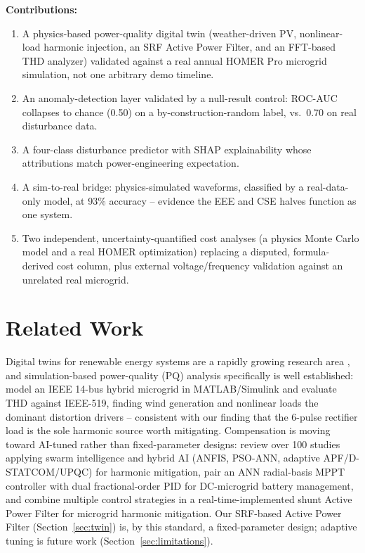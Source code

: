 \documentclass[conference,a4paper]{IEEEtran}
\begin{document}
\textbf{Contributions:}
\begin{enumerate}
\item A physics-based power-quality digital twin (weather-driven PV,
  nonlinear-load harmonic injection, an SRF Active Power Filter, and
  an FFT-based THD analyzer) validated against a real annual HOMER
  Pro microgrid simulation, not one arbitrary demo timeline.
\item An anomaly-detection layer validated by a null-result control:
  ROC-AUC collapses to chance (0.50) on a by-construction-random
  label, vs.\ 0.70 on real disturbance data.
\item A four-class disturbance predictor with SHAP explainability
  whose attributions match power-engineering expectation.
\item A sim-to-real bridge: physics-simulated waveforms, classified
  by a real-data-only model, at 93\% accuracy -- evidence the EEE
  and CSE halves function as one system.
\item Two independent, uncertainty-quantified cost analyses (a
  physics Monte Carlo model and a real HOMER optimization) replacing
  a disputed, formula-derived cost column, plus external
  voltage/frequency validation against an unrelated real microgrid.
\end{enumerate}

\section{Related Work}

Digital twins for renewable energy systems are a rapidly growing
research area \cite{mbasso2025dtreview}, and simulation-based
power-quality (PQ) analysis specifically is well established:
\cite{hernandezmayoral2024pq} model an IEEE 14-bus hybrid microgrid in
MATLAB/Simulink and evaluate THD against IEEE-519, finding wind
generation and nonlinear loads the dominant distortion drivers --
consistent with our finding that the 6-pulse rectifier load is the
sole harmonic source worth mitigating. Compensation is moving toward
AI-tuned rather than fixed-parameter designs: \cite{john2026aipqreview}
review over 100 studies applying swarm intelligence and hybrid AI
(ANFIS, PSO-ANN, adaptive APF/D-STATCOM/UPQC) for harmonic mitigation,
\cite{prakash2025aidcmicrogrid} pair an ANN radial-basis MPPT
controller with dual fractional-order PID for DC-microgrid battery
management, and \cite{barik2025shuntapf} combine multiple control
strategies in a real-time-implemented shunt Active Power Filter for
microgrid harmonic mitigation. Our SRF-based Active Power Filter
(Section~\ref{sec:twin}) is, by this standard, a fixed-parameter
design; adaptive tuning is future work (Section~\ref{sec:limitations}).
\end{document}
